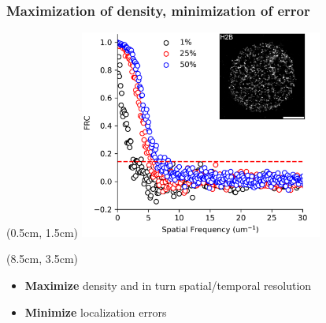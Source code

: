 \documentclass{beamer}					%
\begin{document}

\begin{frame}
\frametitle{Maximization of density, minimization of error}

\begin{textblock*}{8cm}(0.5cm, 1.5cm)
\includegraphics[width=8cm]{../../dissertation/dissertation/media/FRC.png}
\end{textblock*}

\begin{textblock*}{5cm}(8.5cm, 3.5cm)
\begin{itemize}
\item \textbf{Maximize} density and in turn spatial/temporal resolution
\item \textbf{Minimize} localization errors 
\end{itemize}
\end{textblock*}

\end{frame}
\end{document}
